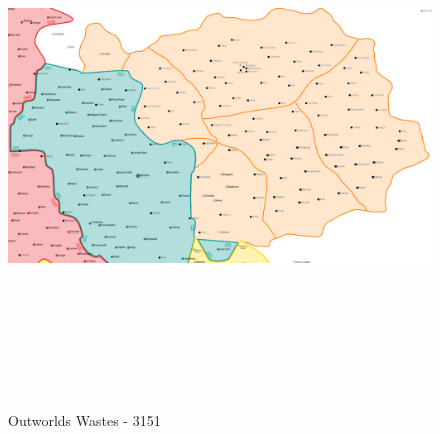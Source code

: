 \begin{figure}[!h]
  \centering
  \includegraphics[alt='Outworlds Wastes map', width=8.9in, height=5.36in]{img/Outworlds-Wastes-ilClan-Map.png}
  \caption*{Outworlds Wastes - 3151}
\end{figure}
